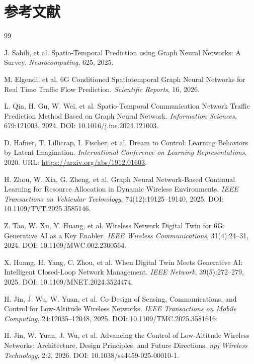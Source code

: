 ﻿\documentclass[UTF8,a4paper,11pt]{ctexart}
\begin{document}
\section{参考文献}

\begin{thebibliography}{99}

J. Sahili, et al. Spatio-Temporal Prediction using Graph Neural Networks: A Survey. \textit{Neurocomputing}, 625, 2025.

M. Elgendi, et al. 6G Conditioned Spatiotemporal Graph Neural Networks for Real Time Traffic Flow Prediction. \textit{Scientific Reports}, 16, 2026.

L. Qin, H. Gu, W. Wei, et al. Spatio-Temporal Communication Network Traffic Prediction Method Based on Graph Neural Network. \textit{Information Sciences}, 679:121003, 2024. DOI: 10.1016/j.ins.2024.121003.

D. Hafner, T. Lillicrap, I. Fischer, et al. Dream to Control: Learning Behaviors by Latent Imagination. \textit{International Conference on Learning Representations}, 2020. URL: \url{https://arxiv.org/abs/1912.01603}.

H. Zhou, W. Xia, G. Zheng, et al. Graph Neural Network-Based Continual Learning for Resource Allocation in Dynamic Wireless Environments. \textit{IEEE Transactions on Vehicular Technology}, 74(12):19125--19140, 2025. DOI: 10.1109/TVT.2025.3585146.

Z. Tao, W. Xu, Y. Huang, et al. Wireless Network Digital Twin for 6G: Generative AI as a Key Enabler. \textit{IEEE Wireless Communications}, 31(4):24--31, 2024. DOI: 10.1109/MWC.002.2300564.

X. Huang, H. Yang, C. Zhou, et al. When Digital Twin Meets Generative AI: Intelligent Closed-Loop Network Management. \textit{IEEE Network}, 39(5):272--279, 2025. DOI: 10.1109/MNET.2024.3524474.

H. Jin, J. Wu, W. Yuan, et al. Co-Design of Sensing, Communications, and Control for Low-Altitude Wireless Networks. \textit{IEEE Transactions on Mobile Computing}, 24:12035--12048, 2025. DOI: 10.1109/TMC.2025.3581616.

H. Jin, W. Yuan, J. Wu, et al. Advancing the Control of Low-Altitude Wireless Networks: Architecture, Design Principles, and Future Directions. \textit{npj Wireless Technology}, 2:2, 2026. DOI: 10.1038/s44459-025-00010-1.


\end{thebibliography}
\end{document}

